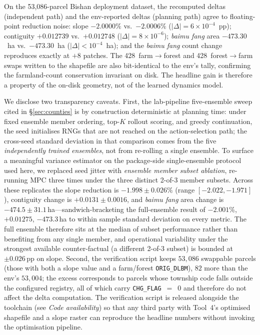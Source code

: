 \documentclass[11pt]{article}
\begin{document}
On the 53{,}086-parcel Bishan deployment dataset, the recomputed deltas (independent path) and the env-reported deltas (planning path) agree to floating-point reduction noise: slope $-2.0000\%$ vs.\ $-2.0006\%$ ($|\Delta|{=}6{\times}10^{-4}$~pp); contiguity $+0.012739$ vs.\ $+0.012748$ ($|\Delta|{=}8{\times}10^{-6}$); \textit{baimu fang} area $-473.30$~ha vs.\ $-473.30$~ha ($|\Delta|{<}10^{-4}$~ha); and the \textit{baimu fang} count change reproduces exactly at $+8$ patches. The 428~farm$\rightarrow$forest and 428~forest$\rightarrow$farm swaps written to the shapefile are also bit-identical to the env's tally, confirming the farmland-count conservation invariant on disk. The headline gain is therefore a property of the on-disk geometry, not of the learned dynamics model.

We disclose two transparency caveats. First, the lab-pipeline five-ensemble sweep cited in \S\ref{sec:counties} is by construction deterministic at planning time: under fixed ensemble member ordering, top-$K$ rollout scoring, and greedy continuation, the seed initialises RNGs that are not reached on the action-selection path; the cross-seed standard deviation in that comparison comes from the five \emph{independently trained ensembles}, not from re-rolling a single ensemble. To surface a meaningful variance estimator on the package-side single-ensemble protocol used here, we replaced seed jitter with \emph{ensemble member subset ablation}, re-running MPC three times under the three distinct 2-of-3 member subsets. Across these replicates the slope reduction is $-1.998 \pm 0.026\%$ (range $[-2.022, -1.971]$), contiguity change is $+0.0131 \pm 0.0016$, and \textit{baimu fang} area change is $-474.5 \pm 31.1$\,ha---sandwich-bracketing the full-ensemble result of $-2.001\%$, $+0.01275$, $-473.3$\,ha to within sample standard deviation on every metric. The full ensemble therefore sits at the median of subset performance rather than benefiting from any single member, and operational variability under the strongest available counter-factual (a different 2-of-3 subset) is bounded at $\pm 0.026$\,pp on slope. Second, the verification script keeps $53{,}086$ swappable parcels (those with both a slope value and a farm/forest \texttt{ORIG\_DLBM}), $82$ more than the env's $53{,}004$; the excess corresponds to parcels whose township code falls outside the configured registry, all of which carry \texttt{CHG\_FLAG}~$=$~$0$ and therefore do not affect the delta computation. The verification script is released alongside the toolchain (see \emph{Code availability}) so that any third party with Tool~4's optimised shapefile and a slope raster can reproduce the headline numbers without invoking the optimisation pipeline.
\end{document}
